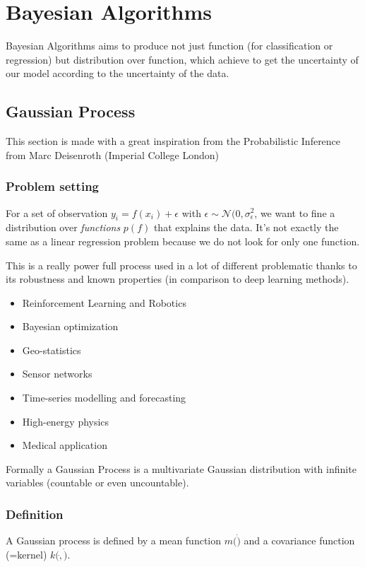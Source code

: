 \chapter{Bayesian Algorithms} %
\label{cha:bayesian_algorithms}

	Bayesian Algorithms aims to produce not just function (for classification or regression) but distribution over function, which achieve to get the uncertainty of our model according to the uncertainty of the data.

	\section{Gaussian Process}

		This section is made with a great inspiration from the Probabilistic Inference from Marc Deisenroth (Imperial College London)
		\subsection{Problem setting} %
		\label{sub:problem_setting}
			For a set of observation $y_i = f(x_i) + \epsilon$ with $\epsilon \sim \mathcal{N}(0, \sigma_\epsilon^2$, we want to fine a distribution over \emph{functions} $p(f)$ that explains the data. It's not exactly the same as a linear regression problem because we do not look for only one function.

			This is a really power full process used in a lot of different problematic thanks to its robustness and known properties (in comparison to deep learning methods).

			\begin{itemize}
				\item Reinforcement Learning and Robotics
				\item Bayesian optimization
				\item Geo-statistics 
				\item Sensor networks
				\item Time-series modelling and forecasting
				\item High-energy physics
				\item Medical application
			\end{itemize}

			Formally a Gaussian Process is a multivariate Gaussian distribution with infinite variables (countable or even uncountable).

			\subsection{Definition} %
			\label{sub:definition}
				A Gaussian process is defined by a mean function $m(\dot)$ and a covariance function (=kernel) $k(\dot, \dot)$.

